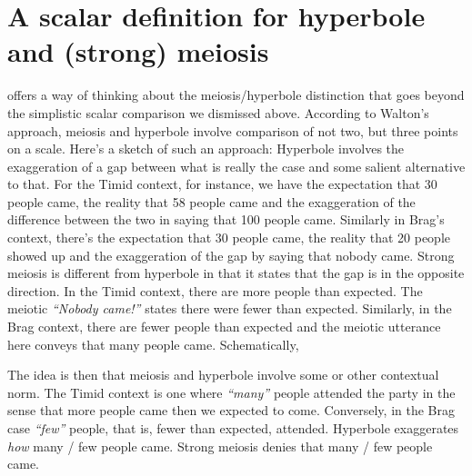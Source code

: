 \documentclass[a4paper,12pt,twoside]{article}
\begin{document}
\section{A scalar definition for hyperbole and (strong) meiosis}

\cite{walton_17} offers a way of thinking about the meiosis/hyperbole distinction that goes beyond the simplistic scalar comparison we dismissed above. According to Walton's approach, meiosis and hyperbole involve comparison of not two, but three points on a scale. Here's a sketch of such an approach: Hyperbole involves the exaggeration of a gap between what is really the case and some salient alternative to that. For the Timid context, for instance, we have the expectation that 30 people came, the reality that 58 people came and the exaggeration of the difference between the two in saying that 100 people came. Similarly in Brag's context, there's the expectation that 30 people came, the reality that 20 people showed up and the exaggeration of the gap by saying that nobody came. Strong meiosis is different from hyperbole in that it states that the gap is in the opposite direction. In the Timid context, there are more people than expected. The meiotic {\em ``Nobody came!''} states there were fewer than expected. Similarly, in the Brag context, there are fewer people than expected and the meiotic utterance here conveys that many people came. Schematically,

\begin{center}        
\vspace{-5ex}  
\end{center}

The idea is then that meiosis and hyperbole involve some or other contextual norm. The Timid context is one where {\em ``many''} people attended the party in the sense that more people came then we expected to come. Conversely, in the Brag case {\em ``few''} people, that is, fewer than expected, attended. Hyperbole exaggerates {\em how} {many} / {few} people came. Strong meiosis denies that {many} / {few} people came.
\end{document}
